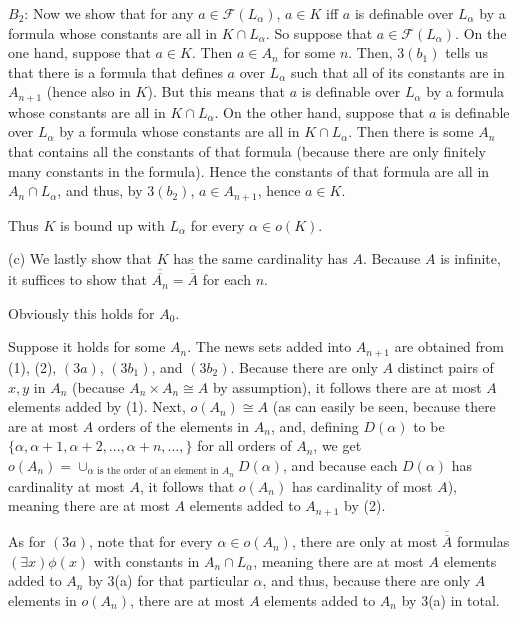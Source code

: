 \documentclass{article}
\theoremstyle{definition}
\begin{document}
$B_2$: Now we show that for any $a\in\mathcal{F}(L_\alpha)$, $a\in K$ iff $a$ is definable over $L_\alpha$ by a formula whose constants are all in 
$K\cap L_\alpha$. So suppose that $a\in\mathcal{F}(L_\alpha)$. On the one hand, suppose that $a\in K$. Then $a\in A_n$ for some $n$. Then, 
$3(b_1)$ tells us that there is a formula that defines $a$ over $L_\alpha$ such that all of its constants are in $A_{n+1}$ (hence also in $K$). But 
this means that $a$ is definable over $L_\alpha$ by a formula whose constants are all in $K\cap L_\alpha$. On the other hand, suppose that 
$a$ is definable over $L_\alpha$ by a formula whose constants are all in $K\cap L_\alpha$. Then there is some $A_n$ that contains all the constants of 
that formula (because there are only finitely many constants in the formula). Hence the constants of that formula are all in $A_n\cap L_\alpha$, and thus, 
by $3(b_2)$, $a\in A_{n+1}$, hence $a\in K$.

Thus $K$ is bound up with $L_\alpha$ for every $\alpha\in o(K)$.

(c) We lastly show that $K$ has the same cardinality has $A$. Because $A$ is infinite, it suffices to show that 
$\overline{\overline{A_n}}=\overline{\overline{A}}$ for each $n$.

Obviously this holds for $A_0$.

Suppose it holds for some $A_n$. The news sets added into $A_{n+1}$ are obtained from (1), (2), $(3a)$, $(3b_1)$, and $(3b_2)$. 
Because there are only $A$ distinct pairs of $x,y$ in $A_n$ (because $A_n\times A_n\cong A$ by assumption), it follows there are at most 
$A$ elements added by (1). Next, $o(A_n)\cong A$ (as can easily be seen, because there are at most $A$ orders of the elements in $A_n$, 
and, defining $D(\alpha)$ to be $\{\alpha,\alpha+1,\alpha+2,...,\alpha+n,...,\}$ for all orders of $A_n$, we get 
$o(A_n)=\cup_{\alpha\textrm{ is the order of an element in $A_n$}}D(\alpha)$, and because each $D(\alpha)$ has cardinality at most 
$A$, it follows that $o(A_n)$ has cardinality of most $A$), meaning there are at most $A$ elements added to $A_{n+1}$ by (2).

As for $(3a)$, note that for every $\alpha\in o(A_n)$, there are only at most $\overline{\overline{A}}$ 
formulas $(\exists x)\phi(x)$ with constants in
$A_n\cap L_\alpha$, meaning there are at most $A$ elements added to $A_n$ by 3(a) for that particular $\alpha$, and thus, because there are 
only $A$ elements in $o(A_n)$, there are at most $A$ elements added to $A_n$ by 3(a) in total.
\end{document}
